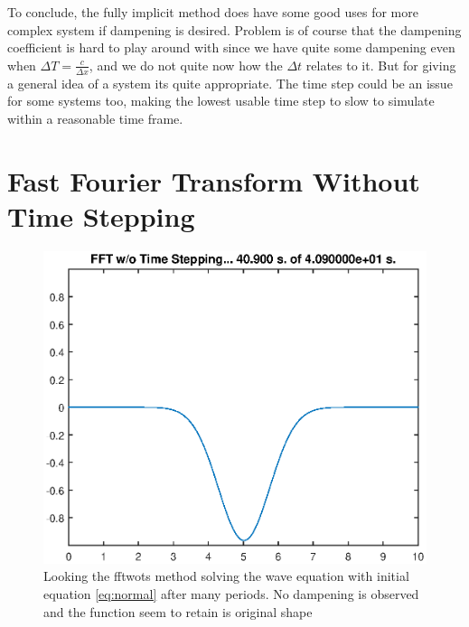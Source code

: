 \documentclass[11pt]{article}
\begin{document}
To conclude, the fully implicit method does have some good uses for more complex system if dampening is desired. Problem is of course that the dampening coefficient is hard to play around with since we have quite some dampening even when $\Delta T = \frac{c}{\Delta x}$, and we do not quite now how the $\Delta t$ relates to it. But for giving a general idea of a system its quite appropriate. The time step could be an issue for some systems too, making the lowest usable time step to slow to simulate within a reasonable time frame. 

\section{Fast Fourier Transform Without Time Stepping}
 \begin{figure}[H]
	\centering
	\includegraphics[width=1\textwidth]{../fftwotsNormal}
	\caption{Looking the fftwots method solving the wave equation with initial equation 
	\ref{eq:normal} after many periods. No dampening is observed and the function seem to retain is original shape}
	\label{fig:fftwotsNormal}
\end{figure}
\end{document}
